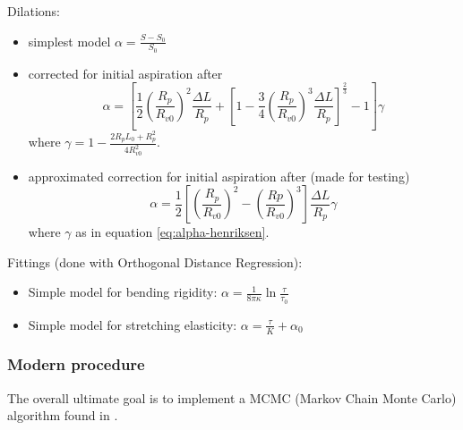 Dilations:
\begin{itemize}
	\item simplest model $\alpha = \frac{S-S_0}{S_0}$
	\item corrected for initial aspiration after \cite{Henriksen2004}
	\begin{equation}
		\alpha = \left[
		 \frac{1}{2} \left(\frac{R_p}{R_{v0}}\right)^2 \frac{\Delta L}{R_p} 
		 + \left[1-\frac{3}{4}\left(\frac{R_p}{R_{v0}}\right)^3 \frac{\Delta L}{R_p} \right]^{\frac{2}{3}}
		 - 1 
		\right]\gamma
		\label{eq:alpha-henriksen}
	\end{equation}
	where $\displaystyle{\gamma = 1-\frac{2R_p L_0+R_p^2}{4R_{v0}^2}}$.
	\item approximated correction for initial aspiration after \cite{Henriksen2004} (made for testing)
	\begin{equation}
		\alpha = \frac{1}{2}\left[
		\left(\frac{R_p}{R_{v0}}\right)^2-\left(\frac{Rp}{R_{v0}}\right)^3\right]
		\frac{\Delta L}{R_p}\gamma
		\label{eq:alpha-henriksen-simple}
	\end{equation}
	where $\gamma$ as in equation \ref{eq:alpha-henriksen}.
\end{itemize}

Fittings (done with Orthogonal Distance Regression):
\begin{itemize}
	\item Simple model for bending rigidity: $\alpha=\frac{1}{8\pi\kappa}\ln{\frac{\tau}{\tau_0}}$
	\item Simple model for stretching elasticity: $\alpha=\frac{\tau}{K}+\alpha_0$
\end{itemize}

\subsubsection{Modern procedure}
The overall ultimate goal is to implement a MCMC (Markov Chain Monte Carlo) algorithm found in  \cite{Henriksen2004}.
